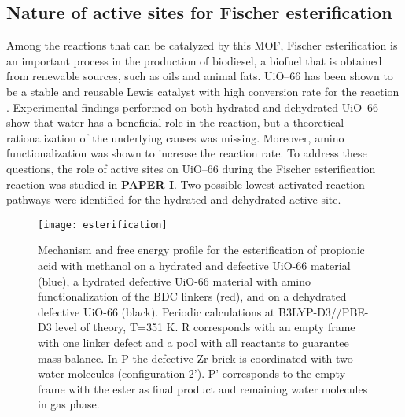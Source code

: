 \subsection{Nature of active sites for Fischer esterification}
 Among the reactions that can be catalyzed by this MOF, Fischer esterification is an important process in the production of biodiesel, a biofuel that is obtained from renewable sources, such as oils and animal fats. UiO--66 has been shown to be a stable and reusable Lewis catalyst with high conversion rate for the reaction \cite{cirujano2015conversion, cirujano2015zirconium}. Experimental findings performed on both hydrated and dehydrated UiO--66 show that water has a beneficial role in the reaction, but a theoretical rationalization of the underlying causes was missing. Moreover, amino functionalization was shown to increase the reaction rate. To address these questions, the role of active sites on UiO--66 during the Fischer esterification reaction was studied in \textbf{PAPER I}. Two possible lowest activated reaction pathways were identified for the hydrated and dehydrated active site.
\begin{figure}[!htbp]
	\centering
	\texttt{[image: esterification]}
	\caption{Mechanism and free energy profile for the esterification of propionic acid with methanol on a hydrated and defective UiO-66 material (blue), a hydrated defective UiO-66 material with amino functionalization of the BDC linkers (red), and on a dehydrated defective UiO-66 (black). Periodic calculations at B3LYP-D3//PBE-D3 level of theory, T=351 K. R corresponds with an empty frame with one linker defect and a pool with all reactants to guarantee mass balance. In P the defective Zr-brick is coordinated with two water molecules (configuration 2’). P’ corresponds to the empty frame with the ester as final product and remaining water molecules in gas phase.}
	\label{fig:esterification}
\end{figure}
\npar
